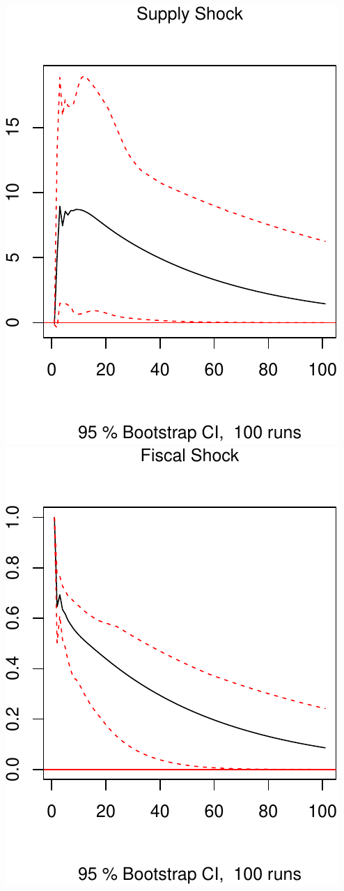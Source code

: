\documentclass[11pt,preprint, authoryear]{elsarticle}
\numberwithin{equation}{section}
\numberwithin{figure}{section}
\numberwithin{table}{section}
\begin{document}
\includegraphics{TS_proj_files/figure-latex/unnamed-chunk-44-1.pdf}
\includegraphics{TS_proj_files/figure-latex/unnamed-chunk-44-2.pdf}
\end{document}
